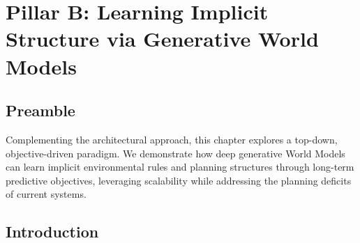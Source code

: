 \chapter{Pillar B: Learning Implicit Structure via Generative World Models}
\label{ch:world-models}

\section*{Preamble}
Complementing the architectural approach, this chapter explores a top-down, objective-driven paradigm. We demonstrate how deep generative World Models can learn implicit environmental rules and planning structures through long-term predictive objectives, leveraging scalability while addressing the planning deficits of current systems.

\section{Introduction}
\blindtext
